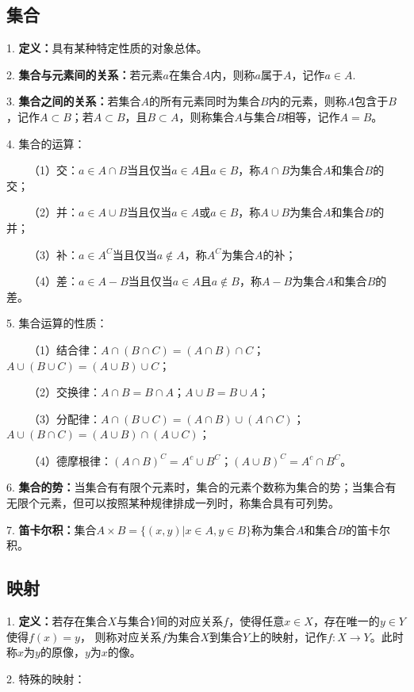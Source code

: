\subsection{集合}

1. \textbf{定义：}具有某种特定性质的对象总体。

2. \textbf{集合与元素间的关系：}若元素$a$在集合$A$内，则称$a$属于$A$，记作$a \in A$.

3. \textbf{集合之间的关系：}若集合$A$的所有元素同时为集合$B$内的元素，则称$A$包含于$B$，记作$A \subset B$；若$A \subset B$，且$B \subset A$，则称集合$A$与集合$B$相等，记作$A=B$。

4. 集合的运算：

~~~~（1）交：$a \in A \cap B$当且仅当$a \in A$且$a \in B$，称$A \cap B$为集合$A$和集合$B$的交；

~~~~（2）并：$a \in A \cup B$当且仅当$a \in A$或$a \in B$，称$A \cup B$为集合$A$和集合$B$的并；

~~~~（3）补：$a \in A^C$当且仅当$a \notin A$，称$A^C$为集合$A$的补；

~~~~（4）差：$a \in A-B$当且仅当$a \in A$且$a \notin B$，称$A-B$为集合$A$和集合$B$的差。

5. 集合运算的性质：

~~~~（1）结合律：$A \cap(B\cap C)=(A \cap B)\cap C$；$A \cup(B\cup C)=(A \cup B)\cup C$；

~~~~（2）交换律：$A\cap B = B \cap A$；$A \cup B = B \cup A$；

~~~~（3）分配律：$A \cap (B \cup C)=(A \cap B)\cup(A\cap C)$；
$A \cup (B \cap C)=(A \cup B)\cap(A\cup C)$；

~~~~（4）德摩根律：$(A\cap B)^C=A^c\cup B^C$；$(A\cup B)^C=A^c\cap B^C$。

6. \textbf{集合的势：}当集合有有限个元素时，集合的元素个数称为集合的势；当集合有无限个元素，但可以按照某种规律排成一列时，称集合具有可列势。

7. \textbf{笛卡尔积：}集合$A\times B =\{(x,y)|x \in A,y \in B\}$称为集合$A$和集合$B$的笛卡尔积。

\subsection{映射}

1. \textbf{定义：}若存在集合$X$与集合$Y$间的对应关系$f$，使得任意$x \in X$，存在唯一的$y \in Y$使得$f(x)=y$，
则称对应关系$f$为集合$X$到集合$Y$上的映射，记作$f:X\rightarrow Y$。此时称$x$为$y$的原像，$y$为$x$的像。

2. 特殊的映射：

